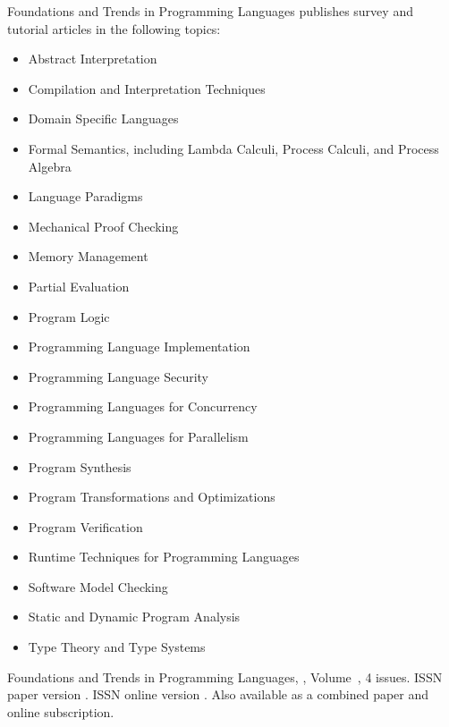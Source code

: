


\journalaimsandscope
 {%
  Foundations and Trends\textsuperscript{\textregistered} in
Programming Languages publishes
 survey and tutorial articles in the following topics: 
\begin{multicols}{2}\raggedcolumns
\begin{itemize}
\item{Abstract Interpretation}
\item{Compilation and Interpretation Techniques}
\item{Domain Specific Languages}
\item{Formal Semantics, including Lambda Calculi, Process Calculi, and Process Algebra}
\item{Language Paradigms}
    \item{Mechanical Proof Checking}
    \item{Memory Management}
    \item{Partial Evaluation}
    \item{Program Logic}
    \item{Programming Language Implementation}
    \item{Programming Language Security}
    \item{Programming Languages for Concurrency}
    \item{Programming Languages for Parallelism}
    \item{Program Synthesis}
    \item{Program Transformations and Optimizations}
    \item{Program Verification}
    \item{Runtime Techniques for Programming Languages}
    \item{Software Model Checking}
    \item{Static and Dynamic Program Analysis}
    \item{Type Theory and Type Systems}
\end{itemize}
\end{multicols}
 }

\journallibraryinfo
 {%
  Foundations and Trends\textsuperscript{\textregistered} in
 Programming Languages, ,
  Volume~, 4 issues.
  ISSN paper version .
  ISSN online version .
  Also available as a combined paper and online
  subscription.
 } 